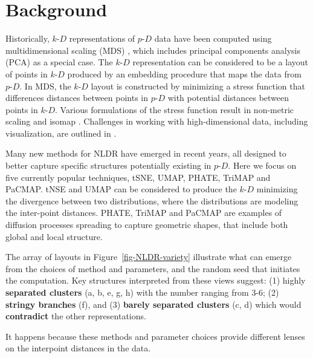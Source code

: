 \documentclass[
  12pt]{article}
\newcommand\pD{$p\text{-}D$}
\newcommand\kD{$k\text{-}D$}
\begin{document}
\section{Background}\label{sec-background}

Historically, \kD{} representations of \pD{} data have been computed
using multidimensional scaling (MDS) \citep{borg2005}, which includes
principal components analysis (PCA) \citep{jolliffe2011} as a special
case. The \kD{} representation can be considered to be a layout of
points in \kD{} produced by an embedding procedure that maps the data
from \pD{}. In MDS, the \kD{} layout is constructed by minimizing a
stress function that differences distances between points in \pD{} with
potential distances between points in \kD{}. Various formulations of the
stress function result in non-metric scaling \citep{saeed2018} and
isomap \citep{silva2002}. Challenges in working with high-dimensional
data, including visualization, are outlined in \citet{johnstone2009}.

Many new methods for NLDR have emerged in recent years, all designed to
better capture specific structures potentially existing in \pD{}. Here
we focus on five currently popular techniques, tSNE, UMAP, PHATE, TriMAP
and PaCMAP. tNSE and UMAP can be considered to produce the \kD{}
minimizing the divergence between two distributions, where the
distributions are modeling the inter-point distances. PHATE, TriMAP and
PaCMAP are examples of diffusion processes \citep{coifman2005} spreading
to capture geometric shapes, that include both global and local
structure.

The array of layouts in Figure~\ref{fig-NLDR-variety} illustrate what
can emerge from the choices of method and parameters, and the random
seed that initiates the computation. Key structures interpreted from
these views suggest: (1) highly \textbf{separated clusters} (a, b, e, g,
h) with the number ranging from 3-6; (2) \textbf{stringy branches} (f),
and (3) \textbf{barely separated clusters} (c, d) which would
\textbf{contradict} the other representations.

It happens because these methods and parameter choices provide different
lenses on the interpoint distances in the data.
\end{document}
